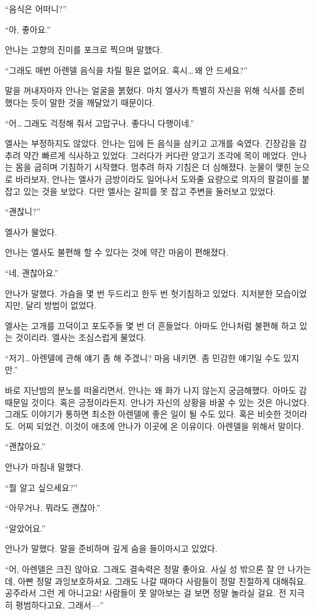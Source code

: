 ``음식은 어떠니?''

``아, 좋아요.''

안나는 고향의 진미를 포크로 찍으며 말했다.

``그래도 매번 아렌델 음식을 차릴 필욘 없어요. 혹시\ldots\,왜 안 드세요?''

말을 꺼내자마자 안나는 얼굴을 붉혔다. 마치 엘사가 특별히 자신을 위해 식사를 준비했다는 듯이 말한 것을 깨달았기 때문이다.

``어\ldots\,그래도 걱정해 줘서 고맙구나. 좋다니 다행이네.''

엘사는 부정하지도 않았다. 안나는 입에 든 음식을 삼키고 고개를 숙였다. 긴장감을 감추려 약간 빠르게 식사하고 있었다. 그러다가 커다란 양고기 조각에 목이 메었다. 안나는 몸을 굽히며 기침하기 시작했다. 멈추려 하자 기침은 더 심해졌다. 눈물이 맺힌 눈으로 바라보자, 안나는 엘사가 금방이라도 일어나서 도와줄 요량으로 의자의 팔걸이를 붙잡고 있는 것을 보았다. 다만 엘사는 갈피를 못 잡고 주변을 둘러보고 있었다.

``괜찮니?''

엘사가 물었다.

안나는 엘사도 불편해 할 수 있다는 것에 약간 마음이 편해졌다.

``네, 괜찮아요.''

안나가 말했다. 가슴을 몇 번 두드리고 한두 번 헛기침하고 있었다. 지저분한 모습이었지만, 달리 방법이 없었다.

엘사는 고개를 끄덕이고 포도주들 몇 번 더 흔들었다. 아마도 안나처럼 불편해 하고 있는 것이리라. 엘사는 조심스럽게 물었다.

``저기\ldots\,아렌델에 관해 얘기 좀 해 주겠니? 마음 내키면. 좀 민감한 얘기일 수도 있지만.''

바로 지난밤의 분노를 떠올리면서, 안나는 왜 화가 나지 않는지 궁금해했다. 아마도 감 때문일 것이다. 혹은 긍정이라든지. 안나가 자신의 상황을 바꿀 수 있는 것은 아니었다. 그래도 이야기가 통하면 최소한 아렌델에 좋은 일이 될 수도 있다. 혹은 비슷한 것이라도. 어찌 되었건, 이것이 애초에 안나가 이곳에 온 이유이다. 아렌델을 위해서 말이다.

``괜찮아요.''

안나가 마침내 말했다.

``뭘 알고 싶으세요?''

``아무거나. 뭐라도 괜찮아.''

``알았어요.''

안나가 말했다. 말을 준비하며 깊게 숨을 들이마시고 있었다.

``어, 아렌델은 크진 않아요. 그래도 결속력은 정말 좋아요. 사실 성 밖으론 잘 안 나가는데, 아빤 정말 과잉보호하셔요. 그래도 나갈 때마다 사람들이 정말 친절하게 대해줘요. 공주라서 그런 게 아니고요! 사람들이 못 알아보는 걸 보면 정말 놀라실 걸요. 전 지극히 평범하다고요, 그래서—''

